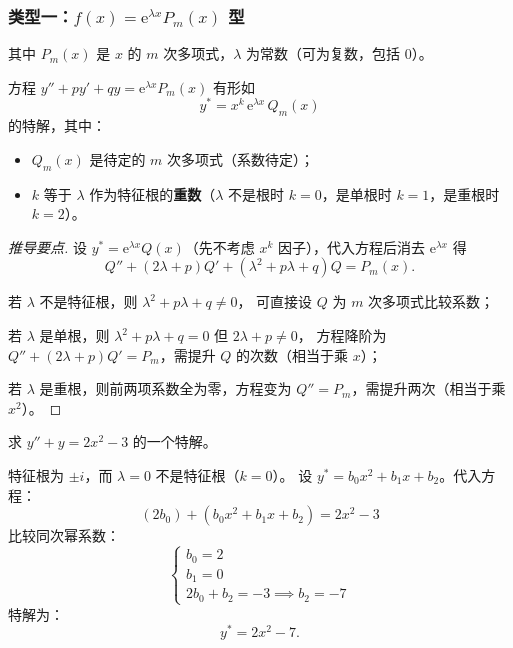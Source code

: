 \documentclass[lang=cn,11pt]{elegantbook}
\begin{document}
\subsubsection{类型一：$f(x)=\mathrm{e}^{\lambda x}P_m(x)$ 型}

其中 $P_m(x)$ 是 $x$ 的 $m$ 次多项式，$\lambda$ 为常数（可为复数，包括 $0$）。

\begin{theorem}[比较系数法的特解形式 I] \label{thm:undetermined-coefficients-type1}
方程 $y''+py'+qy=\mathrm{e}^{\lambda x}P_m(x)$ 有形如
\[
y^*=x^k\,\mathrm{e}^{\lambda x}\,Q_m(x)
\]
的特解，其中：
\begin{itemize}
  \item $Q_m(x)$ 是待定的 $m$ 次多项式（系数待定）；
  \item $k$ 等于 $\lambda$ 作为特征根的\textbf{重数}（$\lambda$ 不是根时 $k=0$，是单根时 $k=1$，是重根时 $k=2$）。
\end{itemize}
\end{theorem}

\begin{proof}[推导要点]
设 $y^*=\mathrm{e}^{\lambda x}Q(x)$（先不考虑 $x^k$ 因子），代入方程后消去 $\mathrm{e}^{\lambda x}$ 得
\[
Q''+(2\lambda+p)Q'+(\lambda^2+p\lambda+q)Q=P_m(x).
\]

若 $\lambda$ 不是特征根，则 $\lambda^2+p\lambda+q\neq 0$，
可直接设 $Q$ 为 $m$ 次多项式比较系数；

若 $\lambda$ 是单根，则 $\lambda^2+p\lambda+q=0$ 但 $2\lambda+p\neq 0$，
方程降阶为 $Q''+(2\lambda+p)Q'=P_m$，需提升 $Q$ 的次数（相当于乘 $x$）；

若 $\lambda$ 是重根，则前两项系数全为零，方程变为 $Q''=P_m$，需提升两次（相当于乘 $x^2$）。
\end{proof}

\begin{exercise}
求 $y''+y=2x^2-3$ 的一个特解。
\end{exercise}
\begin{solution}
特征根为 $\pm i$，而 $\lambda=0$ 不是特征根（$k=0$）。
设 $y^*=b_0x^2+b_1x+b_2$。代入方程：
\[
(2b_0)+(b_0x^2+b_1x+b_2)=2x^2-3
\]
比较同次幂系数：
\[
\begin{cases}
b_0 = 2 \\
b_1 = 0 \\
2b_0+b_2 = -3 \implies b_2=-7
\end{cases}
\]
特解为：
\[
\boxed{y^*=2x^2-7}.
\]
\end{solution}
\end{document}
